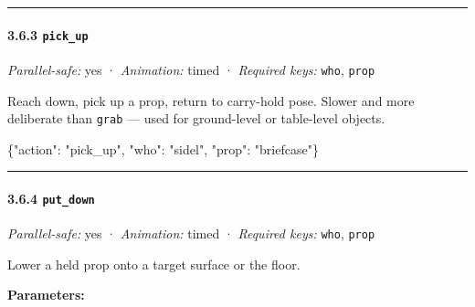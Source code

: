 \documentclass[
  12pt,
  letterpaper,
]{book}
\newenvironment{Shaded}{}{}
\newcommand{\DataTypeTok}[1]{\textcolor[rgb]{0.56,0.13,0.00}{#1}}
\newcommand{\FunctionTok}[1]{\textcolor[rgb]{0.02,0.16,0.49}{#1}}
\newcommand{\StringTok}[1]{\textcolor[rgb]{0.25,0.44,0.63}{#1}}
\begin{document}
\begin{center}\rule{0.5\linewidth}{0.5pt}\end{center}

\paragraph{\texorpdfstring{3.6.3
\texttt{pick\_up}}{3.6.3 pick\_up}}\label{pick_up}

\emph{Parallel-safe:} yes · \emph{Animation:} timed · \emph{Required
keys:} \texttt{who}, \texttt{prop}

Reach down, pick up a prop, return to carry-hold pose. Slower and more
deliberate than \texttt{grab} --- used for ground-level or table-level
objects.

\begin{Shaded}
\begin{Highlighting}[]
\FunctionTok{\{}\DataTypeTok{"action"}\FunctionTok{:} \StringTok{"pick\_up"}\FunctionTok{,} \DataTypeTok{"who"}\FunctionTok{:} \StringTok{"sidel"}\FunctionTok{,} \DataTypeTok{"prop"}\FunctionTok{:} \StringTok{"briefcase"}\FunctionTok{\}}
\end{Highlighting}
\end{Shaded}

\begin{center}\rule{0.5\linewidth}{0.5pt}\end{center}

\paragraph{\texorpdfstring{3.6.4
\texttt{put\_down}}{3.6.4 put\_down}}\label{put_down}

\emph{Parallel-safe:} yes · \emph{Animation:} timed · \emph{Required
keys:} \texttt{who}, \texttt{prop}

Lower a held prop onto a target surface or the floor.

\textbf{Parameters:}
\end{document}
